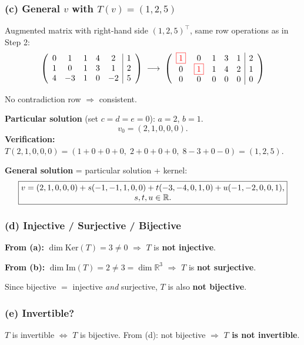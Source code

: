 \documentclass[a4paper,12pt]{article}
\newcommand{\piv}[1]{{\color{red}\boxed{#1}}}
\begin{document}
\subsubsection*{(c) General $v$ with $T(v) = (1, 2, 5)$}

Augmented matrix with right-hand side $(1, 2, 5)^\top$, same row operations as in Step 2:
\[
\left(\begin{array}{ccccc|c}
0 & 1 & 1 & 4 & 2 & 1 \\
1 & 0 & 1 & 3 & 1 & 2 \\
4 & -3 & 1 & 0 & -2 & 5
\end{array}\right)
\;\longrightarrow\;
\left(\begin{array}{ccccc|c}
\piv{1} & 0 & 1 & 3 & 1 & 2 \\
0 & \piv{1} & 1 & 4 & 2 & 1 \\
0 & 0 & 0 & 0 & 0 & 0
\end{array}\right)
\]

No contradiction row $\Rightarrow$ consistent.

\textbf{Particular solution} (set $c = d = e = 0$): $a = 2$, $b = 1$.
\[
v_0 = (2, 1, 0, 0, 0).
\]
\textbf{Verification:} $T(2,1,0,0,0) = (1 + 0 + 0 + 0,\; 2 + 0 + 0 + 0,\; 8 - 3 + 0 - 0) = (1, 2, 5).$ \checkmark

\textbf{General solution} = particular solution + kernel:
\[
\fbox{\parbox{0.93\textwidth}{\centering
$v = (2, 1, 0, 0, 0)
+ s(-1,-1,1,0,0)
+ t(-3,-4,0,1,0)
+ u(-1,-2,0,0,1)$, \; $s, t, u \in \mathbb{R}.$
}}
\]

\subsubsection*{(d) Injective / Surjective / Bijective}

\textbf{From (a):} $\dim \text{Ker}(T) = 3 \neq 0$ $\Rightarrow$ $T$ is \textbf{not injective}.

\textbf{From (b):} $\dim \text{Im}(T) = 2 \neq 3 = \dim \mathbb{R}^3$ $\Rightarrow$ $T$ is \textbf{not surjective}.

Since bijective $=$ injective \emph{and} surjective, $T$ is also \textbf{not bijective}.

\subsubsection*{(e) Invertible?}

$T$ is invertible $\iff$ $T$ is bijective. From (d): not bijective $\Rightarrow$ \textbf{$T$ is not invertible}.
\end{document}
